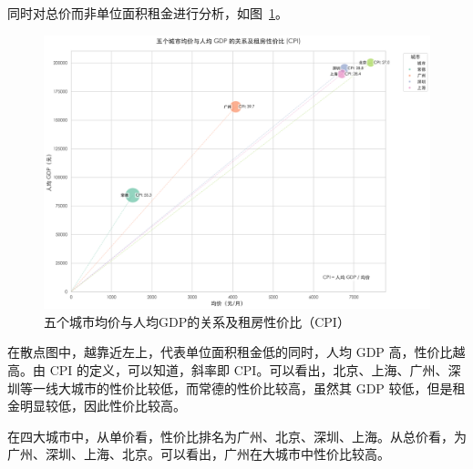 同时对总价而非单位面积租金进行分析，如图~\ref{fig:gdp_price_scatter_chart}。
\begin{figure}[htbp]
    \centering
    \includegraphics[width=0.7\linewidth]{../../figure/gdp_price_scatter_chart.png}
    \caption{五个城市均价与人均GDP的关系及租房性价比（CPI）}
    \label{fig:gdp_price_scatter_chart}
\end{figure}
在散点图中，越靠近左上，代表单位面积租金低的同时，人均 GDP 高，性价比越高。由 CPI 的定义，可以知道，斜率即 CPI。可以看出，北京、上海、广州、深圳等一线大城市的性价比较低，而常德的性价比较高，虽然其 GDP 较低，但是租金明显较低，因此性价比较高。

在四大城市中，从单价看，性价比排名为广州、北京、深圳、上海。从总价看，为广州、深圳、上海、北京。可以看出，广州在大城市中性价比较高。

